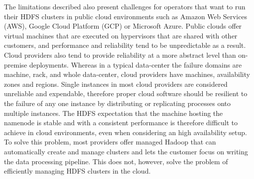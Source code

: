 The limitations described also present challenges for operators that want to run their HDFS clusters in public cloud environments such as Amazon Web Services (AWS), Google Cloud Platform (GCP) or Microsoft Azure.
Public clouds offer virtual machines that are executed on hypervisors that are shared with other customers, and performance and reliability tend to be unpredictable as a result.
Cloud providers also tend to provide reliability at a more abstract level than on-premise deployments.
Whereas in a typical data-center the failure domains are machine, rack, and whole data-center, cloud providers have machines, availability zones and regions.
Single instances in most cloud providers are considered unreliable and expendable, therefore proper cloud software should be resilient to the failure of any one instance by distributing or replicating processes onto multiple instances.
The HDFS expectation that the machine hosting the namenode is stable and with a consistent performance is therefore difficult to achieve in cloud environments, even when considering an high availability setup.
To solve this problem, most providers offer managed Hadoop that can automatically create and manage clusters and lets the customer focus on writing the data processing pipeline.
This does not, however, solve the problem of efficiently managing HDFS clusters in the cloud.

